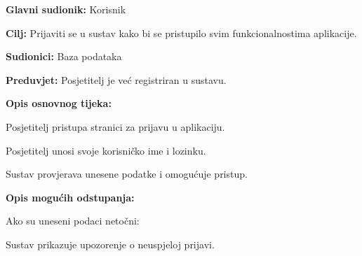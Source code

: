 					\noindent {}
					\begin{packed_item}
						
						\item \textbf{Glavni sudionik: }Korisnik
						\item  \textbf{Cilj:} Prijaviti se u sustav kako bi se pristupilo svim funkcionalnostima aplikacije.
						\item  \textbf{Sudionici:} Baza podataka
						\item  \textbf{Preduvjet:} Posjetitelj je već registriran u sustavu.
						\item  \textbf{Opis osnovnog tijeka:}
						
						\item[] \begin{packed_enum}
							
							\item Posjetitelj pristupa stranici za prijavu u aplikaciju.
							\item Posjetitelj unosi svoje korisničko ime i lozinku.
							\item Sustav provjerava unesene podatke i omogućuje pristup.
						\end{packed_enum}
						
						\item  \textbf{Opis mogućih odstupanja:}
						
						\item[] \begin{packed_item}
							
							\item[3.a] Ako su uneseni podaci netočni:
							\item[] \begin{packed_enum}
								
								\item Sustav prikazuje upozorenje o neuspjeloj prijavi.
								
							\end{packed_enum}

						\end{packed_item}
					\end{packed_item}
					
